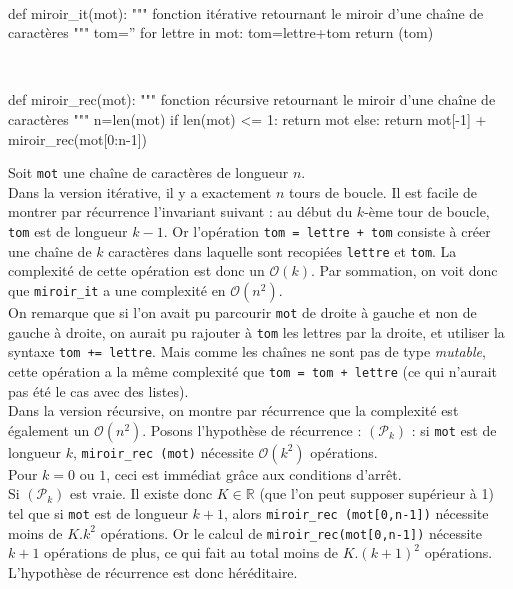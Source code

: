 \begin{corrige}
\question\ 
\begin{python}
def miroir_it(mot):
    """ fonction itérative retournant le miroir d'une chaîne de caractères """
    tom=''
    for lettre in mot:
        tom=lettre+tom
    return (tom)
\end{python}

\question\ 
\begin{python}
def miroir_rec(mot):
    """ fonction récursive retournant le miroir d'une chaîne de caractères """
    n=len(mot)
    if len(mot) <= 1:
        return mot
    else:
        return mot[-1] + miroir_rec(mot[0:n-1])
\end{python}

\setcounter{question}{3}
\question
Soit \texttt{mot} une chaîne de caractères de longueur $n$.\\
Dans la version itérative, il y a exactement $n$ tours de boucle. Il est facile de montrer par récurrence 
l'invariant suivant : au début du $k$-ème tour de boucle, \texttt{tom} est de longueur $k-1$. Or l'opération 
\texttt{tom = lettre + tom} consiste à créer une chaîne de $k$ caractères dans laquelle sont recopiées \texttt{lettre} 
et \texttt{tom}. La complexité de cette opération est donc un $\mathcal O(k)$. Par sommation, on voit donc que 
\texttt{miroir\_it} a une complexité en $\mathcal O(n^2)$.\\
On remarque que si l'on avait pu parcourir \texttt{mot} de droite à gauche et non de gauche à droite, on aurait pu 
rajouter à \texttt{tom} les lettres par la droite, et utiliser la syntaxe \texttt{tom += lettre}. Mais comme les 
chaînes ne sont pas de type \textit{mutable}, cette opération a la même complexité que \texttt{tom = tom + lettre} (ce 
qui n'aurait pas été le cas avec des listes).\\
Dans la version récursive, on montre par récurrence que la complexité est également un $\mathcal O(n^2)$. Posons 
l'hypothèse de 
récurrence : $(\mathcal P _k)$ : si \texttt{mot} est de longueur $k$, \texttt{miroir\_rec (mot)} nécessite $\mathcal 
O(k^2)$ 
opérations.\\
Pour $k=0$ ou $1$, ceci est immédiat grâce aux conditions d'arrêt.\\
Si $(\mathcal P _k)$ est vraie. Il existe donc $K\in\mathbb R$ (que l'on peut supposer supérieur à 1) tel que si 
\texttt{mot} est de longueur $k+1$, alors \texttt{miroir\_rec (mot[0,n-1])} nécessite moins de $K.k^2$ opérations. Or le 
calcul de \texttt{miroir\_rec(mot[0,n-1])} nécessite $k+1$ opérations de plus, ce qui fait au total moins de 
$K.(k+1)^2$ opérations. L'hypothèse de récurrence est donc héréditaire.

\setcounter{question}{0}
\end{corrige}

